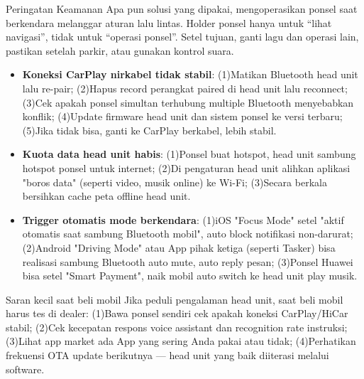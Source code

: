 \begin{tcbwarn}{Peringatan Keamanan}
Apa pun solusi yang dipakai, mengoperasikan ponsel saat berkendara melanggar aturan lalu lintas. Holder ponsel hanya untuk “lihat navigasi”, tidak untuk “operasi ponsel”. Setel tujuan, ganti lagu dan operasi lain, pastikan setelah parkir, atau gunakan kontrol suara.

\end{tcbwarn}


\begin{itemize}
  \item \textbf{Koneksi CarPlay nirkabel tidak stabil}: (1)Matikan Bluetooth head unit lalu re-pair; (2)Hapus record perangkat paired di head unit lalu reconnect; (3)Cek apakah ponsel simultan terhubung multiple Bluetooth menyebabkan konflik; (4)Update firmware head unit dan sistem ponsel ke versi terbaru; (5)Jika tidak bisa, ganti ke CarPlay berkabel, lebih stabil.
  \item \textbf{Kuota data head unit habis}: (1)Ponsel buat hotspot, head unit sambung hotspot ponsel untuk internet; (2)Di pengaturan head unit alihkan aplikasi "boros data" (seperti video, musik online) ke Wi-Fi; (3)Secara berkala bersihkan cache peta offline head unit.
  \item \textbf{Trigger otomatis mode berkendara}: (1)iOS "Focus Mode" setel "aktif otomatis saat sambung Bluetooth mobil", auto block notifikasi non-darurat; (2)Android "Driving Mode" atau App pihak ketiga (seperti Tasker) bisa realisasi sambung Bluetooth auto mute, auto reply pesan; (3)Ponsel Huawei bisa setel "Smart Payment", naik mobil auto switch ke head unit play musik.
\end{itemize}

\begin{tcbinfo}{Saran kecil saat beli mobil}
Jika peduli pengalaman head unit, saat beli mobil harus tes di dealer: (1)Bawa ponsel sendiri cek apakah koneksi CarPlay/HiCar stabil; (2)Cek kecepatan respons voice assistant dan recognition rate instruksi; (3)Lihat app market ada App yang sering Anda pakai atau tidak; (4)Perhatikan frekuensi OTA update berikutnya — head unit yang baik diiterasi melalui software.

\end{tcbinfo}

